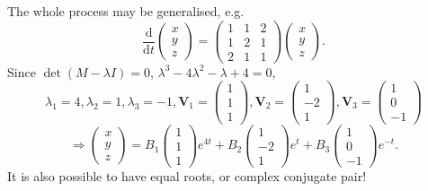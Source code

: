 \documentclass[12pt]{report}
\theoremstyle{definition}
\begin{document}
\begin{enumerate}[label = (\roman*)]
    The whole process may be generalised, e.g.\[
        \frac{\mathrm{d}}{\mathrm{d}t} \begin{pmatrix}
                x \\
                y \\
                z
        \end{pmatrix} = \begin{pmatrix}
        1 & 1 & 2 \\
        1 & 2 & 1 \\
        2 & 1 & 1
        \end{pmatrix} \begin{pmatrix}
                x \\
                y \\
                z
        \end{pmatrix}.
    \]
    Since $\det{(M - \lambda I)} = 0$, $\lambda^{3} - 4 \lambda^{2} - \lambda + 4 = 0$,\[
        \lambda_1 = 4, \lambda_2 = 1, \lambda_3 = -1,
        \mathbf{V}_1 = \begin{pmatrix}
                1 \\
                1 \\
                1
        \end{pmatrix} , \mathbf{V}_2 = \begin{pmatrix}
                1 \\
                -2 \\
                1
        \end{pmatrix} , \mathbf{V}_3 = \begin{pmatrix}
                1 \\
                0 \\
                -1
        \end{pmatrix}
    \]\[
        \Rightarrow{}\begin{pmatrix}
                x \\
                y \\
                z
        \end{pmatrix} = B_1\begin{pmatrix}
                1 \\
                1 \\
                1
        \end{pmatrix} e^{4t} + B_2\begin{pmatrix}
                1 \\
                -2 \\
                1
        \end{pmatrix} e^{t} + B_3\begin{pmatrix}
                1 \\
                0 \\
                -1
        \end{pmatrix} e^{-t}.
    \]
    It is also possible to have equal roots, or complex conjugate pair!
\end{enumerate}
\end{document}
